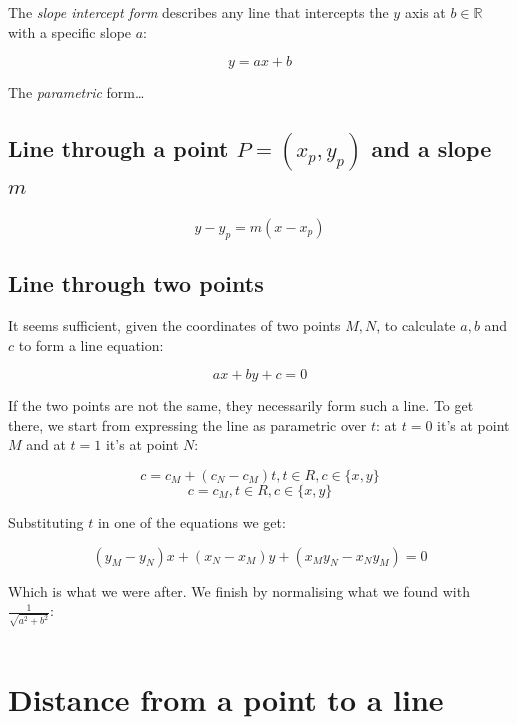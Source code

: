 \documentclass[12pt,openany,a4,usenames,dvipsnames]{book}
\begin{document}
The \emph{slope intercept form} describes any line that intercepts the $y$ axis at $b \in{} \mathbb{R}$ with a specific slope $a$:

$$y=ax+b$$

The \emph{parametric} form\ldots{} %


\section{Line through a point $P=(x_p,y_p)$ and a slope $m$}

$$y-y_p=m(x-x_p)$$

\section{Line through two points}\label{sec:linethroughtwopoints}
\begin{figure}[H]
\centering

\end{figure}
It seems sufficient, given the coordinates of two points $M, N$, to calculate $a, b$ and $c$ to form a line equation:

$$ax+by+c=0$$

If the two points are not the same, they necessarily form such a line. To get there, we start from expressing the line as parametric over $t$: at $t=0$ it's at point $M$ and at $t=1$ it's at point $N$:

$$c = c_M + (c_N - c_M)t, t\in R, c \in \{x, y\}$$
$$c = c_M, t\in R, c \in \{x, y\}$$

Substituting $t$ in one of the equations we get:

$$(y_M - y_N)x + (x_N-x_M)y+(x_{M}y_{N}-x_{N}y_{M})=0$$

Which is what we were after. We finish by normalising what we found with $\frac{1}{\sqrt{a^2+b^2}}$:
\begin{verbatim}
\end{verbatim}

\chapter{Distance from a point to a line}
\begin{figure}[H]
\centering

\end{figure}
\end{document}
